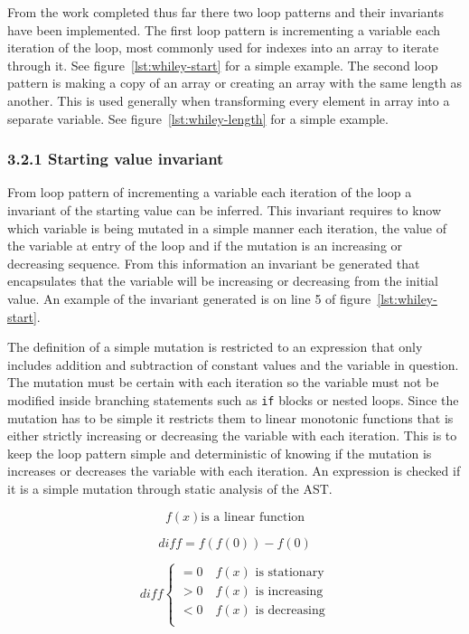 \documentclass[11pt, a4paper, twoside, openright]{report}
\newcommand{\code}[1]{\texttt{#1}}
\begin{document}
From the work completed thus far there two loop patterns and their invariants
have been implemented. The first loop pattern is incrementing a variable
each iteration of the loop, most commonly used for indexes into an array to
iterate through it. See figure~\ref{lst:whiley-start} for a simple example.
The second loop pattern is making a copy of an array or creating an array with
the same length as another. 
This is used generally when transforming every element in array into a separate
variable. See figure~\ref{lst:whiley-length} for a simple example.


\subsubsection*{3.2.1 Starting value invariant}

From loop pattern of incrementing a variable each iteration of the loop
a invariant of the starting value can be inferred.
This invariant requires to know which variable is being 
mutated in a simple manner each iteration,
the value of the variable at entry of the loop and if the mutation is an
increasing or decreasing sequence.
From this information an invariant be generated that encapsulates that the
variable will be increasing or decreasing from the initial value.
An example of the invariant generated is on line 5 of
figure~\ref{lst:whiley-start}.

The definition of a simple mutation is restricted to an expression that only
includes addition and subtraction of constant values and the variable in question.
The mutation must be certain with each iteration so the variable must not be
modified inside branching statements such as \code{if} blocks or nested loops.
Since the mutation has to be simple it restricts them to linear monotonic
functions that is either strictly increasing or decreasing the variable with each iteration.
This is to keep the loop pattern simple and deterministic of knowing if the
mutation is increases or decreases the variable with each iteration.
An expression is checked if it is a simple mutation through static analysis of 
the AST.

\begin{figure}

$$f(x) \text{is a linear function}$$

$$diff = f(f(0)) - f(0)$$

\[
diff \begin{cases}
= 0 \quad f(x) \text{ is stationary}\\
> 0 \quad f(x) \text{ is increasing}\\
< 0 \quad f(x) \text{ is decreasing}\\
\end{cases}
\]

\label{math:simple-mutation}
\end{figure}
\end{document}
